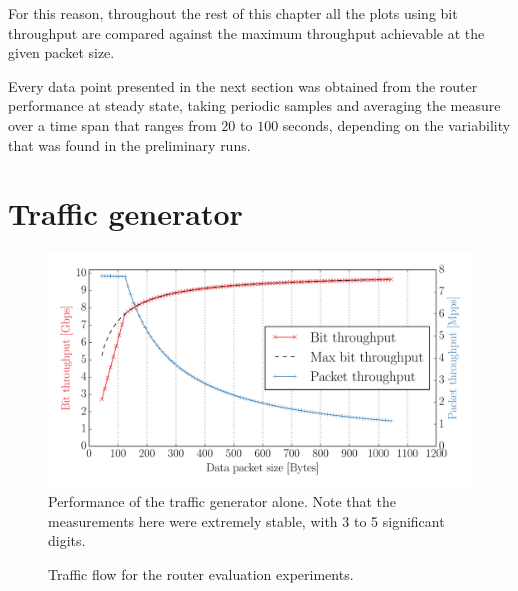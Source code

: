 \documentclass[11pt,a4paper,twoside,titlepage,openany]{book}
\begin{document}
For this reason, throughout the rest of this chapter all the plots using bit throughput are compared against the maximum throughput achievable at the given packet size.

Every data point presented in the next section was obtained from the router performance at steady state, taking periodic samples and averaging the measure over a time span that ranges from $20$ to $100$ seconds, depending on the variability that was found in the preliminary runs.

\section{Traffic generator}\label{sec:test.traffgen}
\begin{figure}[tb]
  \begin{center}
    \includegraphics[width=1.0\textwidth]{img/traffgen_increasing_len.pdf}
    \caption[Performance of the traffic generator alone]{Performance of the traffic generator alone. Note that the measurements here were extremely stable, with 3 to 5 significant digits.}
    \label{fig:test.traffgen-perf}
  \end{center}
\end{figure}
\begin{figure}[tb]
  \begin{center}
    \caption{Traffic flow for the router evaluation experiments.}
    \label{fig:test.flow}
  \end{center}
\end{figure}
\end{document}
